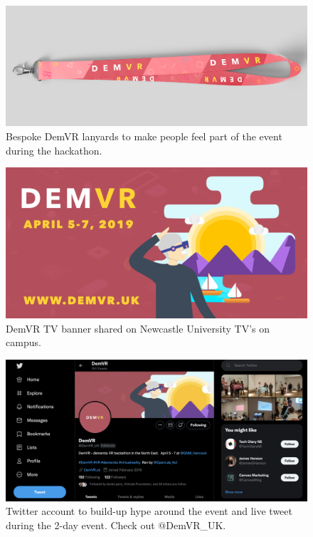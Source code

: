 \begin{figure}[htp]
    \centering
    \includegraphics[width=0.8\linewidth]{Images/Appendix/DemVR appendix/Lanyard.png}
    \caption{Bespoke DemVR lanyards to make people feel part of the event during the hackathon.}
    \label{fig:App:Lanyard}
\end{figure}

\begin{figure}[htp]
    \centering
    \includegraphics[width=0.8\linewidth]{Images/Appendix/DemVR appendix/Banner.png}
    \caption{DemVR TV banner shared on Newcastle University TV's on campus.}
    \label{fig:App:TV-Banner}
\end{figure}

\begin{figure}[htp]
    \centering
\includegraphics[width=0.8\linewidth]{Images/Appendix/DemVR appendix/DemVR_Twitter.png}
    \caption{Twitter account to build-up hype around the event and live tweet during the 2-day event. Check out $@$DemVR\_UK. }
    \label{fig:App:Twitter}
\end{figure}

